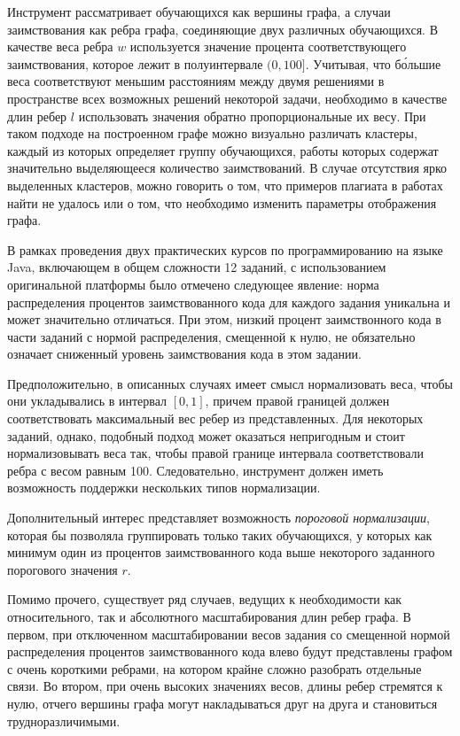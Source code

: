 \documentclass[a4paper,14pt]{extarticle}
\begin{document}
Инструмент рассматривает обучающихся как вершины графа, а случаи заимствования как ребра графа, соединяющие двух различных обучающихся. В качестве веса ребра $w$ используется значение процента соответствующего заимствования, которое лежит в полуинтервале $(0,100]$. Учитывая, что б\'{о}льшие веса соответствуют меньшим расстояниям между двумя решениями в пространстве всех возможных решений некоторой задачи, необходимо в качестве длин ребер $l$ использовать значения обратно пропорциональные их весу. При таком подходе на построенном графе можно визуально различать кластеры, каждый из которых определяет группу обучающихся, работы которых содержат значительно выделяющееся количество заимствований. В случае отсутствия ярко выделенных кластеров, можно говорить о том, что примеров плагиата в работах найти не удалось или о том, что необходимо изменить параметры отображения графа.

В рамках проведения двух практических курсов по программированию на языке Java, включающем в общем сложности 12 заданий, с использованием оригинальной платформы было отмечено следующее явление: норма распределения процентов заимствованного кода для каждого задания уникальна и может значительно отличаться. При этом, низкий процент заимствонного кода в части заданий с нормой распределения, смещенной к нулю, не обязательно означает сниженный уровень заимствования кода в этом задании. 

Предположительно, в описанных случаях имеет смысл нормализовать веса, чтобы они укладывались в интервал $[0, 1]$, причем правой границей должен соответствовать максимальный вес ребер из представленных. Для некоторых заданий, однако, подобный подход может оказаться непригодным и стоит нормализовывать веса так, чтобы правой границе интервала соответствовали ребра с весом равным 100. Следовательно, инструмент должен иметь возможность поддержки нескольких типов нормализации.

Дополнительный интерес представляет возможность \textit{пороговой нормализации}, которая бы позволяла группировать только таких обучающихся, у которых как минимум один из процентов заимствованного кода выше некоторого заданного порогового значения $r$.

Помимо прочего, существует ряд случаев, ведущих к необходимости как относительного, так и абсолютного масштабирования длин ребер графа. В первом, при отключенном масштабировании весов задания со смещенной нормой распределения процентов заимствованного кода влево будут представлены графом с очень короткими ребрами, на котором крайне сложно разобрать отдельные связи. Во втором, при очень высоких значениях весов, длины ребер стремятся к нулю, отчего вершины графа могут накладываться друг на друга и становиться трудноразличимыми.
\end{document}
